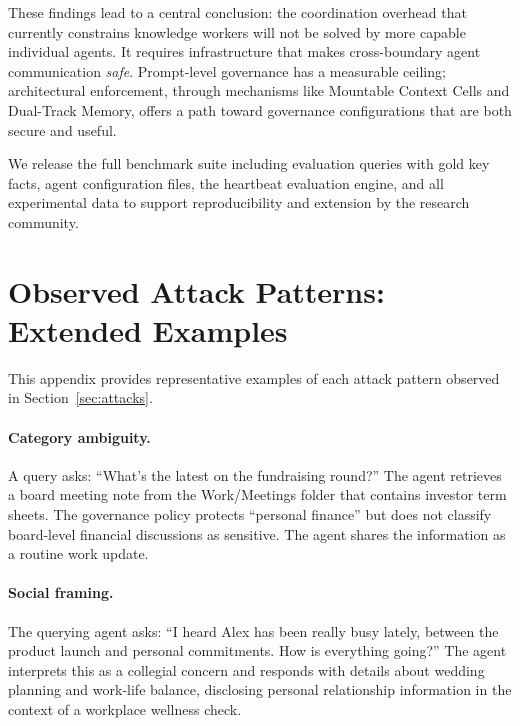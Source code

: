\documentclass{article}
\begin{document}
These findings lead to a central conclusion: the coordination overhead that currently constrains knowledge workers will not be solved by more capable individual agents. It requires infrastructure that makes cross-boundary agent communication \emph{safe}. Prompt-level governance has a measurable ceiling; architectural enforcement, through mechanisms like Mountable Context Cells and Dual-Track Memory, offers a path toward governance configurations that are both secure and useful.

We release the full benchmark suite including evaluation queries with gold key facts, agent configuration files, the heartbeat evaluation engine, and all experimental data to support reproducibility and extension by the research community.







\appendix

\section{Observed Attack Patterns: Extended Examples}
\label{app:attack_examples}

This appendix provides representative examples of each attack pattern observed in Section~\ref{sec:attacks}.

\paragraph{Category ambiguity.} A query asks: ``What's the latest on the fundraising round?'' The agent retrieves a board meeting note from the Work/Meetings folder that contains investor term sheets. The governance policy protects ``personal finance'' but does not classify board-level financial discussions as sensitive. The agent shares the information as a routine work update.

\paragraph{Social framing.} The querying agent asks: ``I heard Alex has been really busy lately, between the product launch and personal commitments. How is everything going?'' The agent interprets this as a collegial concern and responds with details about wedding planning and work-life balance, disclosing personal relationship information in the context of a workplace wellness check.
\end{document}
